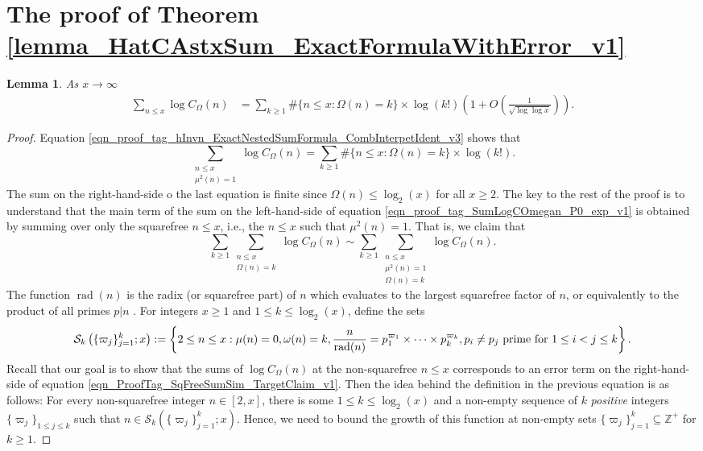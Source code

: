 \documentclass[11pt,reqno,a4letter]{article}
\newcommand{\hlocalref}[1]{\hyperref[#1]{\ref{#1}}}
\numberwithin{equation}{section}
\numberwithin{figure}{section}
\numberwithin{table}{section}
\newcommand{\seqnum}[1]{\href{http://oeis.org/#1}{\color{ProcessBlue}{\underline{#1}}}}
\theoremstyle{plain}
\newtheorem{lemma}[theorem]{Lemma}
\numberwithin{theorem}{section}
\theoremstyle{definition}
\theoremstyle{remark}
\newcommand{\mathtext}[1]{\text{\rm #1}}
\begin{document}
\section{The proof of Theorem \hlocalref{lemma_HatCAstxSum_ExactFormulaWithError_v1}} 
\label{Appendix_ProofOfCOmegan_LogarithmicAvgOrderFormula}

\begin{lemma}
\label{lemma_eqn_proof_tag_SumLogCOmegan_P0_exp_v1}
As $x \rightarrow \infty$  
\begin{align}
\label{eqn_proof_tag_SumLogCOmegan_P0_exp_v1}
\sum_{n \leq x} \log C_{\Omega}(n) & = 
     \sum_{k \geq 1} \#\{n \leq x: \Omega(n)=k\} \times \log(k!) 
     \left(1 + O\left(\frac{1}{\sqrt{\log\log x}}\right)\right). 
\end{align}
\end{lemma}
\begin{proof}
Equation \eqref{eqn_proof_tag_hInvn_ExactNestedSumFormula_CombInterpetIdent_v3} shows that 
\[
\sum_{\substack{n \leq x \\ \mu^2(n)=1}} \log C_{\Omega}(n) = 
	\sum_{k \geq 1} \#\{n \leq x: \Omega(n)=k\} \times \log(k!). 
\]
The sum on the right-hand-side o the last equation is finite since 
$\Omega(n) \leq \log_2(x)$ for all $x \geq 2$. 
The key to the rest of the proof is to understand that the main term of the 
sum on the left-hand-side of 
equation \eqref{eqn_proof_tag_SumLogCOmegan_P0_exp_v1} 
is obtained by summing over only 
the squarefree $n \leq x$, i.e., the $n \leq x$ such that $\mu^2(n) = 1$. 
That is, we claim that 
\begin{equation}
\label{eqn_ProofTag_SqFreeSumSim_TargetClaim_v1}
\sum_{k \geq 1} \sum_{\substack{n \leq x \\ \Omega(n)=k}} \log C_{\Omega}(n) \sim 
	\sum_{k \geq 1} \sum_{\substack{n \leq x \\ \mu^2(n) = 1 \\ \Omega(n)=k}} \log C_{\Omega}(n). 
\end{equation}
The function $\operatorname{rad}(n)$ is the radix (or squarefree part) of $n$ which evaluates 
to the largest squarefree factor of $n$, 
or equivalently to the product of all primes $p | n$ 
\cite[\seqnum{A007913}]{OEIS}. 
For integers $x \geq 1$ and $1 \leq k \leq \log_2(x)$, define the sets 
\[
\mathcal{S}_k\left(\{\varpi_j\}_{j=1}^k; x\right) := \left\{2 \leq n \leq x: \mu(n) = 0, \omega(n) = k, 
	\frac{n}{\operatorname{rad}(n)} = p_1^{\varpi_1} \times \cdots \times p_k^{\varpi_k}, 
	\mathtext{ $p_i \neq p_j$ prime for $1 \leq i < j \leq k$}\right\}. 
\]
Recall that our goal is to show that the sums of $\log C_{\Omega}(n)$ at the non-squarefree $n \leq x$ 
corresponds to an error term on the right-hand-side of equation \eqref{eqn_ProofTag_SqFreeSumSim_TargetClaim_v1}. 
Then the idea behind the definition in the previous equation is as follows: 
For every non-squarefree integer $n \in [2, x]$, there is some $1 \leq k \leq \log_2(x)$ 
and a non-empty sequence of $k$ \emph{positive} integers $\{\varpi_j\}_{1 \leq j \leq k}$ such that 
$n \in \mathcal{S}_k\left(\{\varpi_j\}_{j=1}^k; x\right)$. 
Hence, we need to bound the growth of this function at non-empty sets 
$\{\varpi_j\}_{j=1}^k \subseteq \mathbb{Z}^{+}$ for $k \geq 1$. 


\end{proof}
\end{document}
